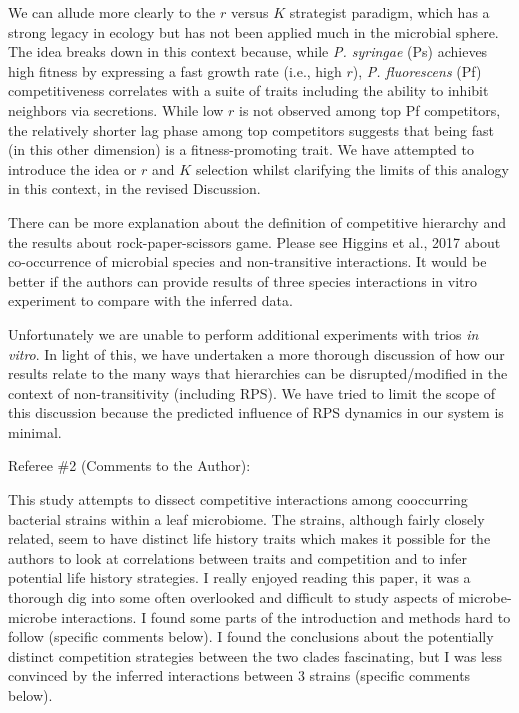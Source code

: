 \documentclass[11pt,]{article}
\begin{document}
We can allude more clearly to the \(r\) versus \(K\) strategist
paradigm, which has a strong legacy in ecology but has not been applied
much in the microbial sphere. The idea breaks down in this context
because, while \emph{P. syringae} (Ps) achieves high fitness by
expressing a fast growth rate (i.e., high \(r\)), \emph{P. fluorescens}
(Pf) competitiveness correlates with a suite of traits including the
ability to inhibit neighbors via secretions. While low \(r\) is not
observed among top Pf competitors, the relatively shorter lag phase
among top competitors suggests that being fast (in this other dimension)
is a fitness-promoting trait. We have attempted to introduce the idea or
\(r\) and \(K\) selection whilst clarifying the limits of this analogy
in this context, in the revised Discussion.

\begin{blockquote}
There can be more explanation about the definition of competitive
hierarchy and the results about rock-paper-scissors game. Please see
Higgins et al., 2017 about co-occurrence of microbial species and
non-transitive interactions. It would be better if the authors can
provide results of three species interactions in vitro experiment to
compare with the inferred data.
\end{blockquote}

Unfortunately we are unable to perform additional experiments with trios
\emph{in vitro}. In light of this, we have undertaken a more thorough
discussion of how our results relate to the many ways that hierarchies
can be disrupted/modified in the context of non-transitivity (including
RPS). We have tried to limit the scope of this discussion because the
predicted influence of RPS dynamics in our system is minimal.

\begin{blockquote}
Referee \#2 (Comments to the Author):

This study attempts to dissect competitive interactions among
cooccurring bacterial strains within a leaf microbiome. The strains,
although fairly closely related, seem to have distinct life history
traits which makes it possible for the authors to look at correlations
between traits and competition and to infer potential life history
strategies. I really enjoyed reading this paper, it was a thorough dig
into some often overlooked and difficult to study aspects of
microbe-microbe interactions. I found some parts of the introduction and
methods hard to follow (specific comments below). I found the
conclusions about the potentially distinct competition strategies
between the two clades fascinating, but I was less convinced by the
inferred interactions between 3 strains (specific comments below).
\end{blockquote}
\end{document}
